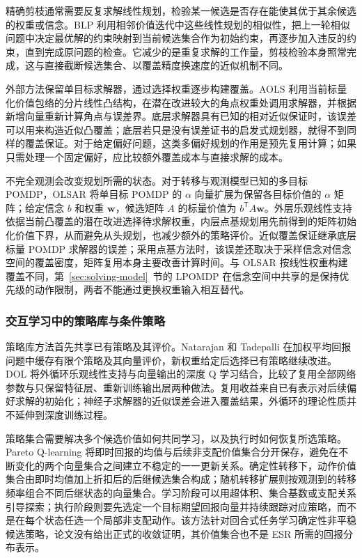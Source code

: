 精确剪枝通常需要反复求解线性规划，检验某一候选是否存在能使其优于其余候选的权重或信念。BLP 利用相邻价值迭代中这些线性规划的相似性，把上一轮相似问题中决定最优解的约束映射到当前候选集合作为初始约束，再逐步加入违反的约束，直到完成原问题的检查\cite{roijers2018bootstrap}。它减少的是重复求解的工作量，剪枝检验本身照常完成，这与直接截断候选集合、以覆盖精度换速度的近似机制不同。

外部方法保留单目标求解器，通过选择权重逐步构建覆盖。AOLS 利用当前标量化价值包络的分片线性凸结构，在潜在改进较大的角点权重处调用求解器，并根据新增向量重新计算角点与误差界\cite{roijers2014aols}。底层求解器具有已知的相对近似保证时，该误差可以用来构造近似凸覆盖；底层若只是没有误差证书的启发式规划器，就得不到同样的覆盖保证。对于给定偏好问题，这类多偏好规划的作用是预先复用计算；如果只需处理一个固定偏好，应比较额外覆盖成本与直接求解的成本。

不完全观测会改变规划所需的状态。对于转移与观测模型已知的多目标 POMDP，OLSAR 将单目标 POMDP 的 $\alpha$ 向量扩展为保留各目标价值的 $\alpha$ 矩阵；给定信念 $b$ 和权重 $\mathbf w$，候选矩阵 $A$ 的标量价值为 $b^{\mathsf T}A\mathbf w$\cite{roijers2015olsar}。外层乐观线性支持依据当前凸覆盖的潜在改进选择待求解权重，内层点基规划用先前得到的矩阵初始化价值下界，从而避免从头规划，也减少额外的策略评价。近似覆盖保证继承底层标量 POMDP 求解器的误差；采用点基方法时，该误差还取决于采样信念对信念空间的覆盖密度，矩阵复用本身主要改善计算时间。与 OLSAR 按线性权重构建覆盖不同，第~\ref{sec:solving-model}~节的 LPOMDP 在信念空间中共享的是保持优先级的动作限制，两者不能通过更换权重输入相互替代。

\subsubsection{交互学习中的策略库与条件策略}

策略库方法首先共享已有策略及其评价。Natarajan 和 Tadepalli 在加权平均回报问题中缓存有限个策略及其向量评价，新权重给定后选择已有策略继续改进\cite{natarajan2005}。DOL 将外循环乐观线性支持与向量输出的深度 Q 学习结合，比较了复用全部网络参数与只保留特征层、重新训练输出层两种做法\cite{mossalam2016dol}。复用收益来自已有表示对后续偏好求解的初始化；神经子求解器的近似误差会进入覆盖结果，外循环的理论性质并不延伸到深度训练过程。

策略集合需要解决多个候选价值如何共同学习，以及执行时如何恢复所选策略。Pareto Q-learning 将即时回报的均值与后续非支配价值集合分开保存，避免在不断变化的两个向量集合之间建立不稳定的一一更新关系\cite{vanmoffaert2014pql}。确定性转移下，动作价值集合由即时均值加上折扣后的后继候选集合构成；随机转移扩展则按观测到的转移频率组合不同后继状态的向量集合。学习阶段可以用超体积、集合基数或支配关系引导探索；执行阶段则要先选定一个目标期望回报向量并持续跟踪对应策略，而不是在每个状态任选一个局部非支配动作。该方法针对回合式任务学习确定性非平稳候选策略，论文没有给出正式的收敛证明，其价值集合也不是 ESR 所需的回报分布表示。

